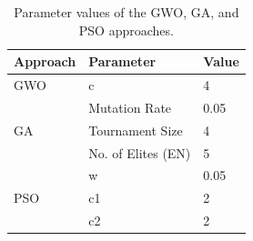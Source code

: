 \begin{table}[h!]
	\centering
	\begin{tabular}{|l|l|l|}
		\hline
		\textbf{Approach}   & \textbf{Parameter} & \textbf{Value} \\ \hline
		GWO                 & c                  & 4              \\ \hline
		\multirow{3}{*}{GA} & Mutation Rate      & 0.05           \\ \cline{2-3} 
		& Tournament Size    & 4              \\ \cline{2-3} 
		& No. of Elites (EN) & 5              \\ \hline
		\multirow{3}{*}{PSO} & w      & 0.05           \\ \cline{2-3} 
		& c1    & 2              \\ \cline{2-3} 
		& c2 	& 2              \\ \hline
	\end{tabular}
	\caption{Parameter values of the GWO, GA, and PSO approaches.}
	\label{approach-parameters}
\end{table}


